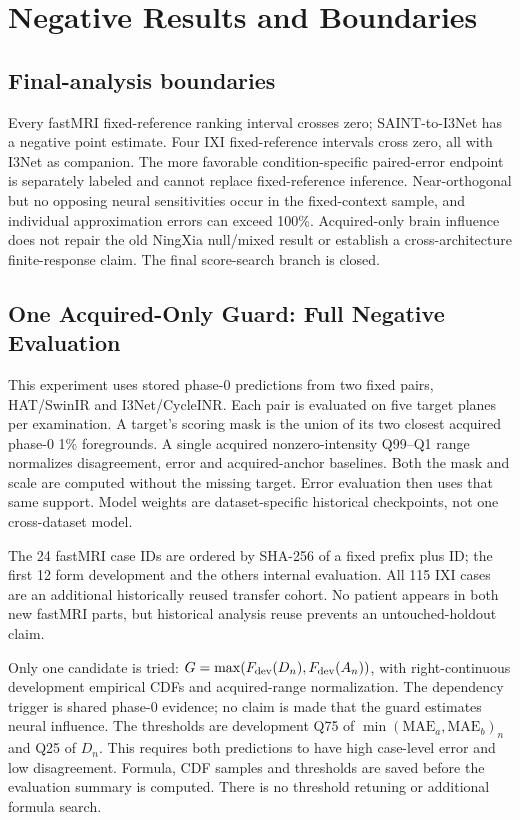 \section{Negative Results and Boundaries}
\subsection{Final-analysis boundaries}
Every fastMRI fixed-reference ranking interval crosses zero; SAINT-to-I3Net has a negative point estimate. Four IXI fixed-reference intervals cross zero, all with I3Net as companion. The more favorable condition-specific paired-error endpoint is separately labeled and cannot replace fixed-reference inference. Near-orthogonal but no opposing neural sensitivities occur in the fixed-context sample, and individual approximation errors can exceed 100\%. Acquired-only brain influence does not repair the old NingXia null/mixed result or establish a cross-architecture finite-response claim. The final score-search branch is closed.

\subsection{One Acquired-Only Guard: Full Negative Evaluation}
This experiment uses stored phase-0 predictions from two fixed pairs, HAT/SwinIR and I3Net/CycleINR. Each pair is evaluated on five target planes per examination. A target's scoring mask is the union of its two closest acquired phase-0 1\% foregrounds. A single acquired nonzero-intensity Q99--Q1 range normalizes disagreement, error and acquired-anchor baselines. Both the mask and scale are computed without the missing target. Error evaluation then uses that same support. Model weights are dataset-specific historical checkpoints, not one cross-dataset model.

The 24 fastMRI case IDs are ordered by SHA-256 of a fixed prefix plus ID; the first 12 form development and the others internal evaluation. All 115 IXI cases are an additional historically reused transfer cohort. No patient appears in both new fastMRI parts, but historical analysis reuse prevents an untouched-holdout claim.

Only one candidate is tried: $G=\max(F_{\rm dev}(D_n),F_{\rm dev}(A_n))$, with right-continuous development empirical CDFs and acquired-range normalization. The dependency trigger is shared phase-0 evidence; no claim is made that the guard estimates neural influence. The thresholds are development Q75 of $\min(\mathrm{MAE}_a,\mathrm{MAE}_b)_n$ and Q25 of $D_n$. This requires both predictions to have high case-level error and low disagreement. Formula, CDF samples and thresholds are saved before the evaluation summary is computed. There is no threshold retuning or additional formula search.


